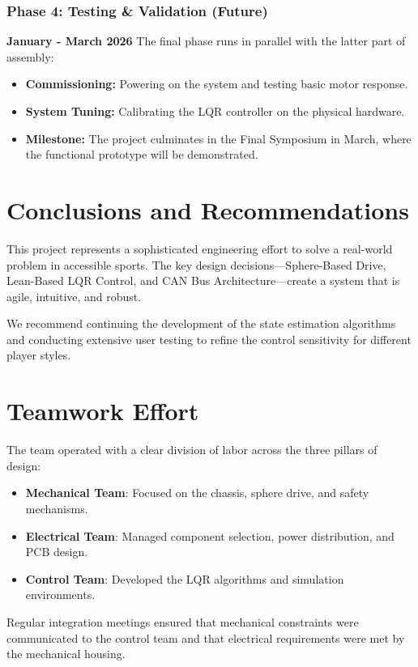 \documentclass[12pt]{article}
\begin{document}
\subsubsection{Phase 4: Testing \& Validation (Future)}
\textbf{January - March 2026}
The final phase runs in parallel with the latter part of assembly:
\begin{itemize}
    \item \textbf{Commissioning:} Powering on the system and testing basic motor response.
    \item \textbf{System Tuning:} Calibrating the LQR controller on the physical hardware.
    \item \textbf{Milestone:} The project culminates in the Final Symposium in March, where the functional prototype will be demonstrated.
\end{itemize}

\section{Conclusions and Recommendations}

This project represents a sophisticated engineering effort to solve a real-world problem in accessible sports. The key design decisions—Sphere-Based Drive, Lean-Based LQR Control, and CAN Bus Architecture—create a system that is agile, intuitive, and robust.

We recommend continuing the development of the state estimation algorithms and conducting extensive user testing to refine the control sensitivity for different player styles.

\section{Teamwork Effort}
The team operated with a clear division of labor across the three pillars of design:
\begin{itemize}
    \item \textbf{Mechanical Team}: Focused on the chassis, sphere drive, and safety mechanisms.
    \item \textbf{Electrical Team}: Managed component selection, power distribution, and PCB design.
    \item \textbf{Control Team}: Developed the LQR algorithms and simulation environments.
\end{itemize}
Regular integration meetings ensured that mechanical constraints were communicated to the control team and that electrical requirements were met by the mechanical housing.
\end{document}
